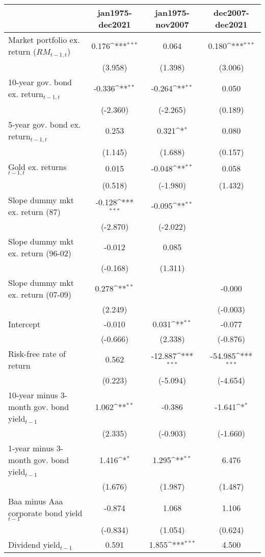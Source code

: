 {
\def\sym#1{\ifmmode^{#1}\else\(^{#1}\)\fi}
\begin{tabular}{@{\extracolsep{2pt}}l*{3}{c}@{}}
\hline\hline


 & jan1975-dec2021 & jan1975-nov2007 & dec2007-dec2021 \\
\hline
Market portfolio ex. return ($RM_{t-1,t}$) & 0.176\sym{***} & 0.064 & 0.180\sym{***} \\
 & (3.958) & (1.398) & (3.006) \\
10-year gov. bond ex. return$_{t-1,t}$ & -0.336\sym{**} & -0.264\sym{**} & 0.050 \\
 & (-2.360) & (-2.265) & (0.189) \\
5-year gov. bond ex. return$_{t-1,t}$ & 0.253 & 0.321\sym{*} & 0.080 \\
 & (1.145) & (1.688) & (0.157) \\
Gold ex. returns$_{t-1,t}$ & 0.015 & -0.048\sym{**} & 0.058 \\
 & (0.518) & (-1.980) & (1.432) \\
Slope dummy mkt ex. return (87) & -0.128\sym{***} & -0.095\sym{**} &  \\
 & (-2.870) & (-2.022) &  \\
Slope dummy mkt ex. return (96-02) & -0.012 & 0.085 &  \\
 & (-0.168) & (1.311) &  \\
Slope dummy mkt ex. return (07-09) & 0.278\sym{**} &  & -0.000 \\
 & (2.249) &  & (-0.003) \\
Intercept & -0.010 & 0.031\sym{**} & -0.077 \\
 & (-0.666) & (2.338) & (-0.876) \\
Risk-free rate of return & 0.562 & -12.887\sym{***} & -54.985\sym{***} \\
 & (0.223) & (-5.094) & (-4.654) \\
10-year minus 3-month gov. bond yield$_{t-1}$ & 1.062\sym{**} & -0.386 & -1.641\sym{*} \\
 & (2.335) & (-0.903) & (-1.660) \\
1-year minus 3-month gov. bond yield$_{t-1}$ & 1.416\sym{*} & 1.295\sym{**} & 6.476 \\
 & (1.676) & (1.987) & (1.487) \\
Baa minus Aaa corporate bond yield$_{t-1}$ & -0.874 & 1.068 & 1.106 \\
 & (-0.834) & (1.054) & (0.624) \\
Dividend yield$_{t-1}$ & 0.591 & 1.855\sym{***} & 4.500 \\

\end{tabular}}
